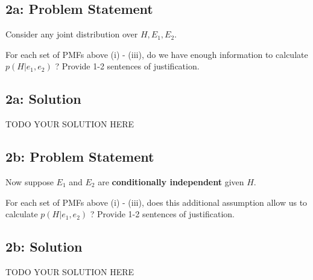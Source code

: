 \documentclass[10pt]{article}
\newcommand{\officialdirections}[1]{{\color{purple} #1}}
\begin{document}
\officialdirections{
\subsection*{2a: Problem Statement}
Consider any joint distribution over $H, E_1, E_2$.

For each set of PMFs above (i) - (iii), do we have enough information to calculate $p(H | e_1, e_2)$ ? Provide 1-2 sentences of justification.
}

\subsection{2a: Solution}
TODO YOUR SOLUTION HERE

\officialdirections{
\subsection*{2b: Problem Statement}
Now suppose $E_1$ and $E_2$ are \textbf{conditionally independent} given $H$.

For each set of PMFs above (i) - (iii), does this additional assumption allow us to calculate $p(H | e_1, e_2)$ ? Provide 1-2 sentences of justification.
}

\subsection{2b: Solution}
TODO YOUR SOLUTION HERE
\end{document}
